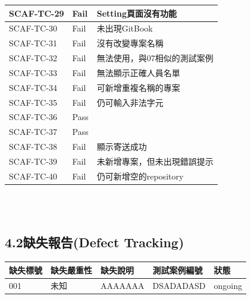 \documentclass{report}
\begin{document}
\begin{tabularx}{\textwidth}{
  |p{}%
  |p{}%
  |p{}|%
}
  \hline
  SCAF-TC-29 & Fail & Setting頁面沒有功能 \\ \hline
  SCAF-TC-30 & Fail & 未出現GitBook \\ \hline
  SCAF-TC-31 & Fail & 沒有改變專案名稱 \\ \hline
  SCAF-TC-32 & Fail & 無法使用，與07相似的測試案例 \\ \hline
  SCAF-TC-33 & Fail & 無法顯示正確人員名單 \\ \hline
  SCAF-TC-34 & Fail & 可新增重複名稱的專案 \\ \hline
  SCAF-TC-35 & Fail & 仍可輸入非法字元 \\ \hline
  SCAF-TC-36 & Pass &  \\ \hline
  SCAF-TC-37 & Pass &  \\ \hline
  SCAF-TC-38 & Fail & 顯示寄送成功 \\ \hline
  SCAF-TC-39 & Fail & 未新增專案，但未出現錯誤提示 \\ \hline
  SCAF-TC-40 & Fail & 仍可新增空的repository \\ \hline
\end{tabularx}
\\
\newline
\\

\subsection*{4.2缺失報告(Defect Tracking)}
\begin{tabularx}{\textwidth}{ 
  |p{}%
  |p{}%
  |p{}%
  |p{}%
  |p{}|%
}
  \hline
  缺失標號 & 缺失嚴重性 & 缺失說明 & 測試案例編號 & 狀態\\
  \hline
  001 & 未知 & AAAAAAA & DSADADASD & ongoing  \\
  \hline
\end{tabularx}
\\
\newline
\\
\end{document}

